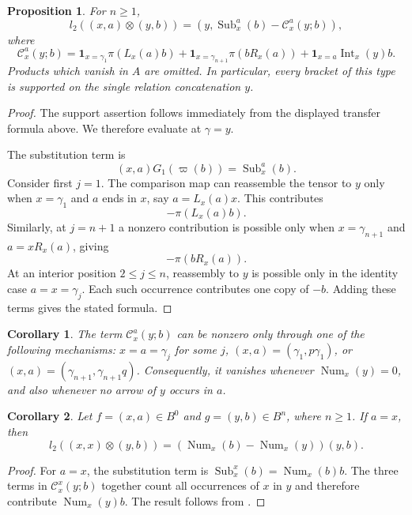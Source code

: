 \documentclass[11pt,a4paper,reqno]{amsart}
\newcommand{\mC}{\mathcal C}
\newcommand{\Sub}{\operatorname{Sub}}
\newcommand{\Int}{\operatorname{Int}}
\newcommand{\para}[2]{(#1,#2)}
\newcommand{\num}[2]{\operatorname{Num}_{#1}(#2)}
\newcommand{\one}{\mathbf 1}
\theoremstyle{plain}
\newtheorem{corollary}[corollary]{Corollary}
\newtheorem{proposition}[proposition]{Proposition}
\theoremstyle{definition}
\numberwithin{equation}{section}
\begin{document}
	\begin{proposition}\label{MSBF}
		For $n\ge1$,
		\[
		l_2(\para{x}{a}\otimes\para{y}{b})
		=
		\para{y}{\Sub_x^a(b)-\mC_x^a(y;b)},
		\]
		where
		\[
		\mC_x^a(y;b)
		=
		\one_{x=\gamma_1}\pi(L_x(a)b)
		+\one_{x=\gamma_{n+1}}\pi(bR_x(a))
		+\one_{x=a}\Int_x(y)b.
		\]
		Products which vanish in $A$ are omitted.  In particular, every bracket of
		this type is supported on the single relation concatenation $y$.
	\end{proposition}
	
	\begin{proof}
		The support assertion follows immediately from the displayed transfer
		formula above.  We therefore evaluate at $\gamma=y$.
		
		The substitution term is
		\[
		\para{x}{a}G_1(\varpi(b))=\Sub_x^a(b).
		\]
		Consider first $j=1$.  The comparison map can
		reassemble the tensor to $y$ only when $x=\gamma_1$ and $a$ ends in $x$, say
		$a=L_x(a)x$.  This contributes
		\[
		-\pi(L_x(a)b).
		\]
		Similarly, at $j=n+1$ a nonzero contribution is possible only when
		$x=\gamma_{n+1}$ and $a=xR_x(a)$, giving
		\[
		-\pi(bR_x(a)).
		\]
		At an interior position $2\le j\le n$, reassembly to $y$ is possible only in
		the identity case $a=x=\gamma_j$.  Each such occurrence contributes one copy
		of $-b$.  Adding these terms gives the stated formula.
	\end{proof}
	\begin{corollary}\label{mixed-boundary-summand-eq-cases}
		The term $\mC_x^a(y;b)$ can be nonzero only
		through one of the following mechanisms: $x=a=\gamma_j$ for some
		$j$, $\para{x}{a}=\para{\gamma_1}{p\gamma_1}$, or
		$\para{x}{a}=\para{\gamma_{n+1}}{\gamma_{n+1}q}$.
		Consequently, it vanishes whenever $\num{x}{y}=0$, and also whenever no arrow
		of $y$ occurs in $a$.
	\end{corollary}
	\begin{corollary}\label{01-x-equal-to-a}
		Let $f=\para{x}{a}\in B^0$ and $g=\para{y}{b}\in B^n$, where $n\ge1$.
		If $a=x$, then
		\[
		l_2(\para{x}{x}\otimes\para{y}{b})
		=
		(\num{x}{b}-\num{x}{y})\para{y}{b}.
		\]
	\end{corollary}
	
	\begin{proof}
		For $a=x$, the substitution term is
		$\Sub_x^x(b)=\num{x}{b}b$.  The three terms in $\mC_x^x(y;b)$ together
		count all occurrences of $x$ in $y$ and therefore contribute
		$\num{x}{y}b$.  The result follows from .
	\end{proof}
	
\end{document}
